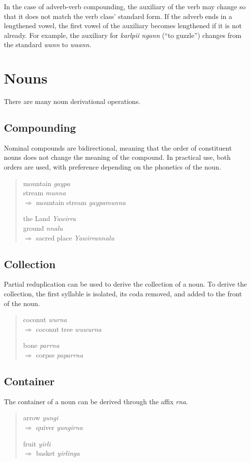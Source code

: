 In the case of adverb-verb compounding, the auxiliary of the verb may change so
that it does not match the verb class' standard form. If the adverb ends in a
lengthened vowel, the first vowel of the auxiliary becomes lengthened if it is
not already. For example, the auxiliary for \textit{karlpii ngann} (``to
guzzle'') changes from the standard \textit{wann} to \textit{waann}.

\section{Nouns}

There are many noun derivational operations.

\subsection{Compounding}

Nominal compounds are bidirectional, meaning that the order of constituent nouns
does not change the meaning of the compound. In practical use, both orders are
used, with preference depending on the phonetics of the noun.

\begin{quote}
\begin{multicols}{2}
mountain \textit{gaypa}\\
stream \textit{munna}\\
$\Rightarrow$ mountain stream \textit{gaypamunna}

the Land \textit{Yawirra}\\
ground \textit{nnalu}\\
$\Rightarrow$ sacred place \textit{Yawirrannalu}
\end{multicols}
\end{quote}

\subsection{Collection}

Partial reduplication can be used to derive the collection of a noun. To derive
the collection, the first syllable is isolated, its coda removed, and added to
the front of the noun.

\begin{quote}
\begin{multicols}{2}
coconut \textit{wurna}\\
$\Rightarrow$ coconut tree \textit{wuwurna}

bone \textit{parrna}\\
$\Rightarrow$ corpse \textit{paparrna}
\end{multicols}
\end{quote}

\subsection{Container}

The container of a noun can be derived through the affix \textit{rna}.

\begin{quote}
\begin{multicols}{2}
arrow \textit{yungi}\\
$\Rightarrow$ quiver \textit{yungirna}

fruit \textit{yirli}\\
$\Rightarrow$ basket \textit{yirlinga}
\end{multicols}
\end{quote}
